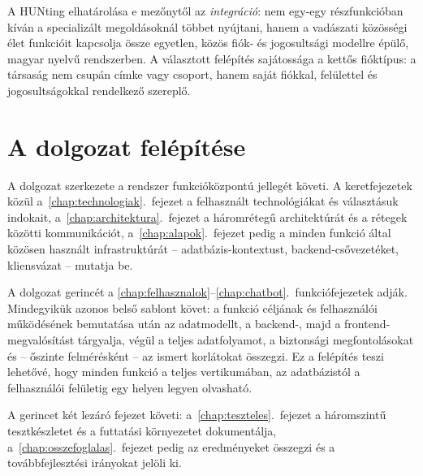 A HUNting elhatárolása e mezőnytől az \emph{integráció}: nem egy-egy részfunkcióban kíván a
specializált megoldásoknál többet nyújtani, hanem a vadászati közösségi élet funkcióit kapcsolja
össze egyetlen, közös fiók- és jogosultsági modellre épülő, magyar nyelvű rendszerben. A
választott felépítés sajátossága a kettős fióktípus: a társaság nem csupán címke vagy csoport,
hanem saját fiókkal, felülettel és jogosultságokkal rendelkező szereplő.

\section{A dolgozat felépítése}
\label{sec:bev-felepites}

A dolgozat szerkezete a rendszer funkcióközpontú jellegét követi. A keretfejezetek közül
a~\ref{chap:technologiak}.~fejezet a felhasznált technológiákat és választásuk indokait,
a~\ref{chap:architektura}.~fejezet a háromrétegű architektúrát és a rétegek közötti
kommunikációt, a~\ref{chap:alapok}.~fejezet pedig a minden funkció által közösen használt
infrastruktúrát -- adatbázis-kontextust, backend-csővezetéket, kliensvázat -- mutatja be.

A dolgozat gerincét a \ref{chap:felhasznalok}--\ref{chap:chatbot}.~funkciófejezetek adják.
Mindegyikük azonos belső sablont követ: a funkció céljának és felhasználói működésének
bemutatása után az adatmodellt, a backend-, majd a frontend-megvalósítást tárgyalja, végül a
teljes adatfolyamot, a biztonsági megfontolásokat és -- őszinte felmérésként -- az ismert
korlátokat összegzi. Ez a felépítés teszi lehetővé, hogy minden funkció a teljes vertikumában,
az adatbázistól a felhasználói felületig egy helyen legyen olvasható.

A gerincet két lezáró fejezet követi: a~\ref{chap:teszteles}.~fejezet a háromszintű
tesztkészletet és a futtatási környezetet dokumentálja, a~\ref{chap:osszefoglalas}.~fejezet
pedig az eredményeket összegzi és a továbbfejlesztési irányokat jelöli ki.

